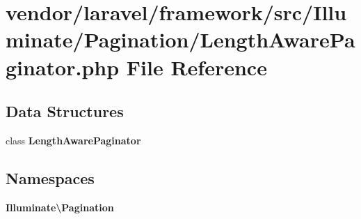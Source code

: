 \section{vendor/laravel/framework/src/\+Illuminate/\+Pagination/\+Length\+Aware\+Paginator.php File Reference}
\label{_pagination_2_length_aware_paginator_8php}
\subsection*{Data Structures}
\begin{DoxyCompactItemize}
\item 
class {\bf Length\+Aware\+Paginator}
\end{DoxyCompactItemize}
\subsection*{Namespaces}
\begin{DoxyCompactItemize}
\item 
 {\bf Illuminate\textbackslash{}\+Pagination}
\end{DoxyCompactItemize}

